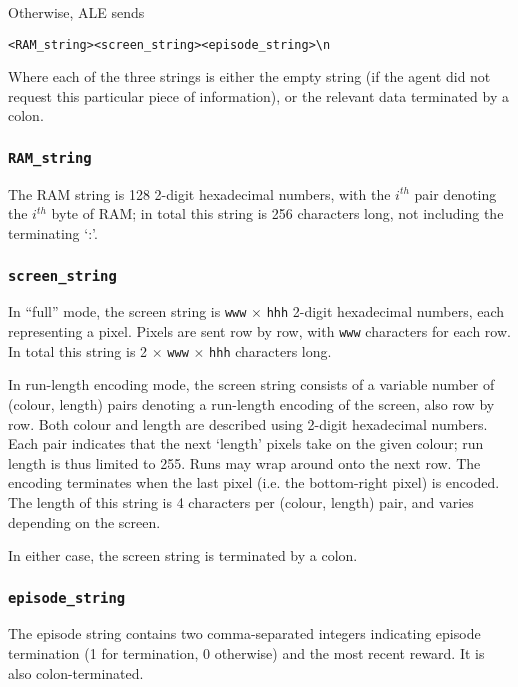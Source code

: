 \documentclass[12pt]{article}
\begin{document}
Otherwise, ALE sends

\begin{verbatim}
<RAM_string><screen_string><episode_string>\n
\end{verbatim}

Where each of the three strings is either the empty string (if the agent did not request this
particular piece of information), or the relevant data terminated by a colon.

\subsubsection{\texttt{RAM\_string}}

The RAM string is 128 2-digit hexadecimal numbers, with the $i^{th}$ pair denoting the
$i^{th}$ byte of RAM; in total this string is 256 characters long, not including the terminating
`:'.

\subsubsection{\texttt{screen\_string}}

In ``full'' mode, the screen string is \texttt{www} $\times$ \texttt{hhh} 2-digit hexadecimal numbers, each representing a pixel. Pixels are sent row by row, with \texttt{www} characters for each row. In total this string is 2 $\times$ \texttt{www} $\times$ \texttt{hhh} characters long.

In run-length encoding mode, the screen string consists of a variable number of (colour, length) pairs denoting a run-length encoding of the screen, also row by row. Both colour and length are described using 2-digit hexadecimal numbers. Each pair indicates that the next `length' pixels take on the given colour; run length is thus limited to 255. Runs may wrap around onto the next row. The encoding terminates when the last pixel (i.e. the bottom-right pixel) is encoded. The length of this string is 4 characters per (colour, length) pair, and varies depending on the screen.

In either case, the screen string is terminated by a colon.

\subsubsection{\texttt{episode\_string}}

The episode string contains two comma-separated integers indicating episode termination (1 for
termination, 0 otherwise) and the most recent reward. It is also colon-terminated.
\end{document}
